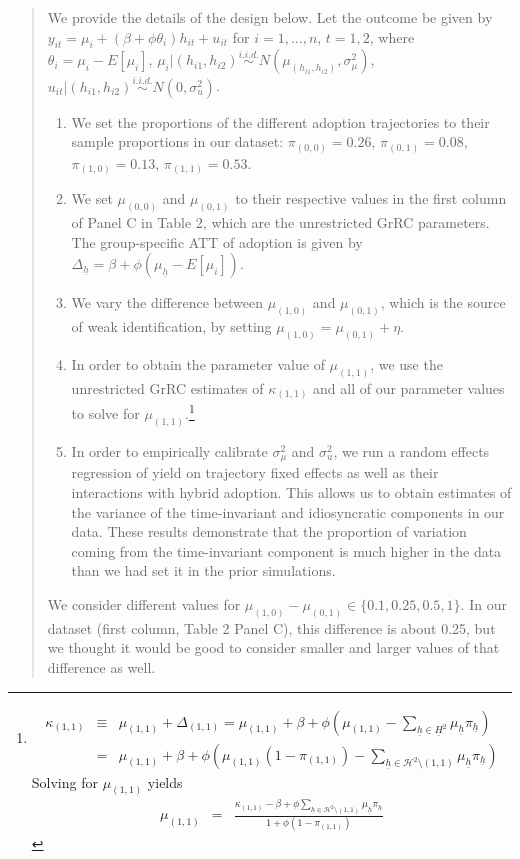 \documentclass{article}[11pt]
\begin{document}
\begin{enumerate}
\begin{quote}
We provide the details of the design below. Let the outcome be given by $ y_{it} =\mu_{i}+(\beta+\phi\theta_{i})h_{it}+u_{it}$ for $ i=1,\dots,n$, $ t=1,2$, where $\theta_{i}=\mu_{i}-E[\mu_{i}]$, $\mu_{i}|(h_{i1},h_{i2})\overset{i.i.d.}{\sim} N(\mu_{(h_{i1},h_{i2})},\sigma_{\mu}^2)$, $ u_{it}|(h_{i1},h_{i2})\overset{i.i.d.}{\sim} N(0,\sigma_u^2)$. 
\begin{enumerate}
\item We set the proportions of the different adoption trajectories to their sample proportions in our dataset: $\pi_{(0,0)}=0.26$, $\pi_{(0,1)}=0.08$,  $\pi_{(1,0)}=0.13$, $\pi_{(1,1)}=0.53$.
\item We set $\mu_{(0,0)}$ and $\mu_{(0,1)}$ to their respective values in the first column of Panel C in Table 2, which are the unrestricted GrRC parameters. The group-specific ATT of adoption is given by $\Delta_{\underline{h}}=\beta+\phi(\mu_{\underline{h}}-E[\mu_i])$.
\item We vary the difference between $\mu_{(1,0)}$ and $\mu_{(0,1)}$, which is the source of weak identification, by setting $\mu_{(1,0)}=\mu_{(0,1)}+\eta$.
\item In order to obtain the parameter value of $\mu_{(1,1)}$, we use the unrestricted GrRC estimates of $\kappa_{(1,1)}$ and all of our parameter values to solve for $\mu_{(1,1)}$.\footnote{
\begin{eqnarray}
    \kappa_{(1,1)}&\equiv&\mu_{(1,1)}+\Delta_{(1,1)}=\mu_{(1,1)}+\beta+\phi\left(\mu_{(1,1)}-\sum_{\underline{h}\in\underline{H}^2}\mu_{\underline{h}}\pi_{\underline{h}}\right)\nonumber\\
    &=&\mu_{(1,1)}+\beta+\phi\left(\mu_{(1,1)}(1-\pi_{(1,1)})-\sum_{\underline{h}\in\mathcal{H}^2\setminus (1,1)}\mu_{\underline{h}}\pi_{\underline{h}}\right)
\end{eqnarray}
Solving for $\mu_{(1,1)}$ yields
\begin{eqnarray}
   \mu_{(1,1)}&=&\frac{\kappa_{(1,1)}-\beta+\phi\sum_{\underline{h}\in\mathcal{H}^2\setminus (1,1)}\mu_{\underline{h}}\pi_{\underline{h}}}{1+\phi(1-\pi_{(1,1)})}
\end{eqnarray}}
\item In order to empirically calibrate $\sigma_{\mu}^2$ and $\sigma_u^2$, we run a random effects regression of yield on trajectory fixed effects as well as their interactions with hybrid adoption. This allows us to obtain estimates of the variance of the time-invariant and idiosyncratic components in our data. These results demonstrate that the proportion of variation coming from the time-invariant component is much higher in the data than we had set it in the prior simulations.
\end{enumerate}
We consider different values for $\mu_{(1,0)}-\mu_{(0,1)}\in\{0.1,0.25,0.5,1\}$. In our dataset (first column, Table 2 Panel C), this difference is about 0.25, but we thought it would be good to consider smaller and larger values of that difference as well.



\end{quote}
\end{enumerate}
\end{document}
